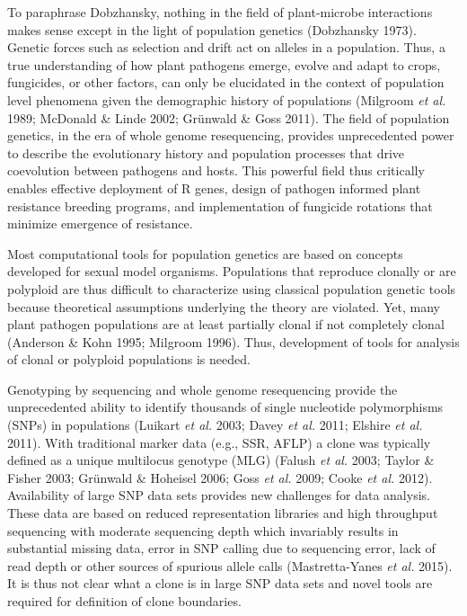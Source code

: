 \documentclass[double,12pt]{beavtex}
\begin{document}
  To paraphrase Dobzhansky, nothing in the field of plant-microbe
  interactions makes sense except in the light of population genetics
  (Dobzhansky 1973). Genetic forces such as selection and drift act on
  alleles in a population. Thus, a true understanding of how plant
  pathogens emerge, evolve and adapt to crops, fungicides, or other
  factors, can only be elucidated in the context of population level
  phenomena given the demographic history of populations (Milgroom
  \emph{et al.} 1989; McDonald \& Linde 2002; Grünwald \& Goss 2011). The
  field of population genetics, in the era of whole genome resequencing,
  provides unprecedented power to describe the evolutionary history and
  population processes that drive coevolution between pathogens and hosts.
  This powerful field thus critically enables effective deployment of R
  genes, design of pathogen informed plant resistance breeding programs,
  and implementation of fungicide rotations that minimize emergence of
  resistance.
  
  Most computational tools for population genetics are based on concepts
  developed for sexual model organisms. Populations that reproduce
  clonally or are polyploid are thus difficult to characterize using
  classical population genetic tools because theoretical assumptions
  underlying the theory are violated. Yet, many plant pathogen populations
  are at least partially clonal if not completely clonal (Anderson \& Kohn
  1995; Milgroom 1996). Thus, development of tools for analysis of clonal
  or polyploid populations is needed.
  
  Genotyping by sequencing and whole genome resequencing provide the
  unprecedented ability to identify thousands of single nucleotide
  polymorphisms (SNPs) in populations (Luikart \emph{et al.} 2003; Davey
  \emph{et al.} 2011; Elshire \emph{et al.} 2011). With traditional marker
  data (e.g., SSR, AFLP) a clone was typically defined as a unique
  multilocus genotype (MLG) (Falush \emph{et al.} 2003; Taylor \& Fisher
  2003; Grünwald \& Hoheisel 2006; Goss \emph{et al.} 2009; Cooke \emph{et
  al.} 2012). Availability of large SNP data sets provides new challenges
  for data analysis. These data are based on reduced representation
  libraries and high throughput sequencing with moderate sequencing depth
  which invariably results in substantial missing data, error in SNP
  calling due to sequencing error, lack of read depth or other sources of
  spurious allele calls (Mastretta-Yanes \emph{et al.} 2015). It is thus
  not clear what a clone is in large SNP data sets and novel tools are
  required for definition of clone boundaries.
  
\end{document}
